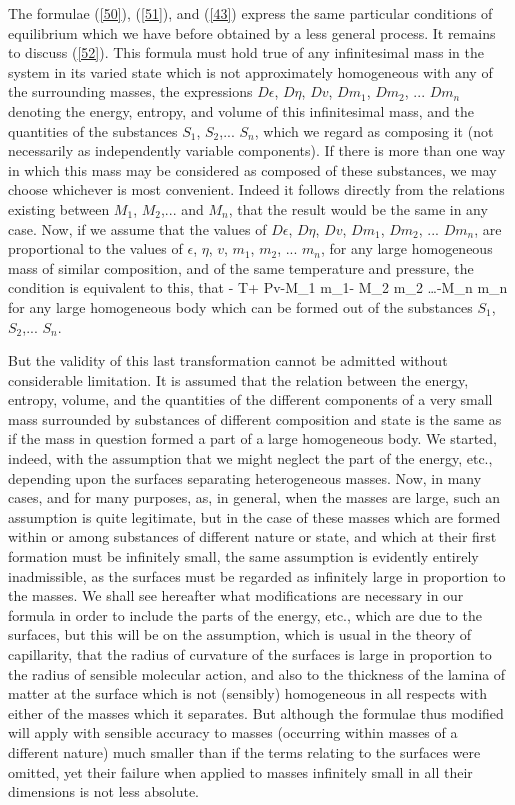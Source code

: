 \documentclass[12pt]{article}
\begin{document}
The formulae (\ref{50}), (\ref{51}), and (\ref{43}) express the same particular conditions of equilibrium which we have before obtained by a less general process. It remains to discuss (\ref{52}). This formula must hold true of any infinitesimal mass in the system in its varied state which is not approximately homogeneous with any of the surrounding masses, the expressions $D\epsilon$, $D\eta$, $Dv$, $Dm_1$, $Dm_2$, ... $D m_n$ denoting the energy, entropy, and volume of this infinitesimal mass, and the quantities of the substances $S_1$, $S_2$,... $S_n$, which we regard as composing it (not necessarily as independently variable components). If there is more than one way in which this mass may be considered as composed of these substances, we may choose whichever is most convenient. Indeed it follows directly from the relations existing between $M_1$, $M_2$,... and $M_n$, that the result would be the same in any case. Now, if we assume that the values of $D\epsilon$, $D\eta$, $Dv$, $Dm_1$, $Dm_2$, ... $D m_n$, are proportional to the values of $\epsilon$, $\eta$, $v$, $m_1$, $m_2$, ... $m_n$, for any large homogeneous mass of similar composition, and of the same temperature and pressure, the condition is equivalent to this, that
\eqs \epsilon- T\eta + Pv-M_1 m_1- M_2 m_2 \dots -M_n m_n       \label{53}\eqe
for any large homogeneous body which can be formed out of the substances $S_1$, $S_2$,... $S_n$.


But the validity of this last transformation cannot be admitted without considerable limitation. It is assumed that the relation between the energy, entropy, volume, and the quantities of the different components of a very small mass surrounded by substances of different composition and state is the same as if the mass in question formed a part of a large homogeneous body. We started, indeed, with the assumption that we might neglect the part of the energy, etc., depending upon the surfaces separating heterogeneous masses. Now, in many cases, and for many purposes, as, in general, when the masses are large, such an assumption is quite legitimate, but in the case of these masses which are formed within or among substances of different nature or state, and which at their first formation must be infinitely small, the same assumption is evidently entirely inadmissible, as the surfaces must be regarded as infinitely large in proportion to the masses. We shall see hereafter what modifications are necessary in our formula in order to include the parts of the energy, etc., which are due to the surfaces, but this will be on the assumption, which is usual in the theory of capillarity, that the radius of curvature of the surfaces is large in proportion to the radius of sensible molecular action, and also to the thickness of the lamina of matter at the surface which is not (sensibly) homogeneous in all respects with either of the masses which it separates. But although the formulae thus modified will apply with sensible accuracy to masses (occurring within masses of a different nature) much smaller than if the terms relating to the surfaces were omitted, yet their failure when applied to masses infinitely small in all their dimensions is not less absolute.
\end{document}
